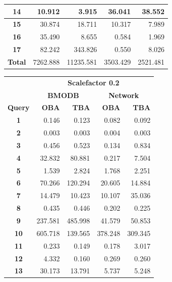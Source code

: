 \documentclass[a4paper]{article}
\begin{document}
{\begin{figure}[h]
\begin{minipage}{0.5\linewidth}
\begin{tiny}
\begin{tabular}{|c|r|r|r|r|}
        \hline
        \textbf{14}&10.912&3.915&36.041&38.552\\
        \hline
        \textbf{15}&30.874&18.711&10.317&7.989\\
        \hline
        \textbf{16}&35.490&8.655&0.584&1.969\\
        \hline
        \textbf{17}&82.242&343.826&0.550&8.026\\
        \hline
        \textbf{Total}&7262.888&11235.581&3503.429&2521.481\\
        \hline
      \end{tabular}
    \end{tiny}
  \end{minipage}\hfill
  \begin{minipage}{0.5\linewidth}
    \begin{tiny}
      \begin{tabular}{|c|r|r|r|r|}
        \hline
        &\multicolumn{4}{c|}{\textbf{Scalefactor 0.2}}\\
        \cline{2-5}
        &\multicolumn{2}{c|}{\textbf{BMODB}}&\multicolumn{2}{c|}{\textbf{Network}}\\
        \hline
        \textbf{Query}&\textbf{OBA}&\textbf{TBA}&\textbf{OBA}&\textbf{TBA}\\
        \hline
        \textbf{1}&0.146&0.123&0.082&0.092\\
        \hline
        \textbf{2}&0.003&0.003&0.004&0.003\\
        \hline
        \textbf{3}&0.456&0.523&0.134&0.834\\
        \hline
        \textbf{4}&32.832&80.881&0.217&7.504\\
        \hline
        \textbf{5}&1.539&2.824&1.768&2.251\\
        \hline
        \textbf{6}&70.266&120.294&20.605&14.884\\
        \hline
        \textbf{7}&14.479&10.423&10.107&35.036\\
        \hline
        \textbf{8}&0.435&0.446&0.202&0.225\\
        \hline
        \textbf{9}&237.581&485.998&41.579&50.853\\
        \hline
        \textbf{10}&605.718&139.565&378.248&309.345\\
        \hline
        \textbf{11}&0.233&0.149&0.178&3.017\\
        \hline
        \textbf{12}&4.332&0.160&0.269&0.260\\
        \hline
        \textbf{13}&30.173&13.791&5.737&5.248\\

\end{tabular}
\end{tiny}
\end{minipage}
\end{figure}}
\end{document}
